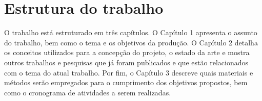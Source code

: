 \section{Estrutura do trabalho}\label{sec:estruturaTrabalho}

O trabalho está estruturado em três capítulos. O Capítulo 1 apresenta o assunto do trabalho, bem
como o tema e os objetivos da produção. O Capítulo 2 detalha os conceitos utilizados para a
concepção do projeto, o estado da arte e mostra outros trabalhos e pesquisas que já foram publicados
e que estão relacionados com o tema do atual trabalho. Por fim, o Capítulo 3 descreve quais
materiais e métodos serão empregados para o cumprimento dos objetivos propostos, bem como o
cronograma de atividades a serem realizadas.